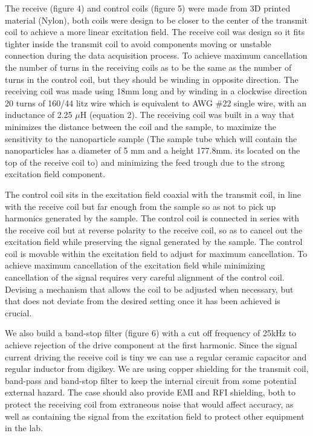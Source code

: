 \documentclass[fleqn,10pt]{document} %
\begin{document}
The receive (figure 4) and control coils (figure 5) were made from 3D printed material (Nylon), both coils were design to be closer to the center of the transmit coil to achieve a more linear excitation field. The receive coil was design so it fits tighter inside the transmit coil to avoid components moving or unstable connection during the data acquisition process. To achieve maximum cancellation the number of turns in the receiving coils as to be the same as the number of turns in the control coil, but they should be winding in opposite direction. The receiving coil was made using 18mm long and by winding in a clockwise direction 20 turns of 160/44 litz wire which is equivalent to AWG \#22 single wire, with an inductance of 2.25 $\mu$H (equation 2). The receiving coil was built in a way that minimizes the distance between the coil and the sample, to maximize the sensitivity to the nanoparticle sample (The sample tube which will contain the nanoparticles has a diameter of 5 mm and a height 177.8mm. its located on the top of the receive coil to) and minimizing the feed trough due to the strong excitation field component.

The control coil sits in the excitation field coaxial with the transmit coil, in line with the receive coil but far enough from the sample so as not to pick up harmonics generated by the sample. The control coil is connected in series with the receive coil but at reverse polarity to the receive coil, so as to cancel out the excitation field while preserving the signal generated by the sample. The control coil is movable within the excitation field to adjust for maximum cancellation. To achieve maximum cancellation of the excitation field while minimizing cancellation of the signal requires very careful alignment of the control coil. Devising a mechanism that allows the coil to be adjusted when necessary, but that does not deviate from the desired setting once it has been achieved is crucial.
   
We also build a band-stop filter (figure 6) with a cut off frequency of 25kHz to achieve rejection of the drive component at the first harmonic. Since the signal current driving the receive coil is tiny we can use a regular ceramic capacitor and regular inductor from digikey. 
We are using copper shielding for the transmit coil, band-pass and band-stop filter to keep the internal circuit from some potential external hazard. The case should also provide EMI and RFI shielding, both to protect the receiving coil from extraneous noise that would affect accuracy, as well as containing the signal from the excitation field to protect other equipment in the lab.
\end{document}
